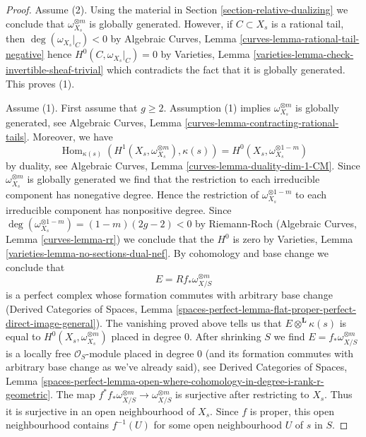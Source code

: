 \documentclass[10pt,a4paper]{amsart}
\theoremstyle{plain}
\theoremstyle{definition}
\theoremstyle{remark}
\numberwithin{equation}{subsection}
\def\Hom{\mathop{\mathrm{Hom}}\nolimits}
\begin{document}
\begin{proof}
Assume (2). Using the material in Section \ref{section-relative-dualizing}
we conclude that $\omega_{X_s}^{\otimes m}$ is
globally generated. However, if $C \subset X_s$
is a rational tail, then $\deg(\omega_{X_s}|_C) < 0$ by
Algebraic Curves, Lemma \ref{curves-lemma-rational-tail-negative}
hence $H^0(C, \omega_{X_s}|_C) = 0$ by
Varieties, Lemma \ref{varieties-lemma-check-invertible-sheaf-trivial}
which contradicts the fact that it is globally generated.
This proves (1).

\medskip\noindent
Assume (1). First assume that $g \geq 2$. Assumption (1) 
implies $\omega_{X_s}^{\otimes m}$ is globally generated,
see Algebraic Curves, Lemma \ref{curves-lemma-contracting-rational-tails}.
Moreover, we have
$$
\Hom_{\kappa(s)}(H^1(X_s, \omega_{X_s}^{\otimes m}), \kappa(s)) =
H^0(X_s, \omega_{X_s}^{\otimes 1 - m})
$$
by duality, see Algebraic Curves, Lemma \ref{curves-lemma-duality-dim-1-CM}.
Since $\omega_{X_s}^{\otimes m}$ is globally generated we find
that the restriction to each irreducible component has nonegative degree.
Hence the restriction of $\omega_{X_s}^{\otimes 1 - m}$ to each
irreducible component has nonpositive degree. Since
$\deg(\omega_{X_s}^{\otimes 1 - m}) = (1 - m)(2g - 2) < 0$ by Riemann-Roch
(Algebraic Curves, Lemma \ref{curves-lemma-rr}) we conclude that the $H^0$
is zero by Varieties, Lemma \ref{varieties-lemma-no-sections-dual-nef}.
By cohomology and base change we conclude that
$$
E = Rf_*\omega_{X/S}^{\otimes m}
$$
is a perfect complex whose formation commutes with arbitrary base change
(Derived Categories of Spaces, Lemma
\ref{spaces-perfect-lemma-flat-proper-perfect-direct-image-general}).
The vanishing proved above tells us that $E \otimes^\mathbf{L} \kappa(s)$
is equal to $H^0(X_s, \omega_{X_s}^{\otimes m})$ placed in degree $0$.
After shrinking $S$ we find $E = f_*\omega_{X/S}^{\otimes m}$
is a locally free $\mathcal{O}_S$-module placed in degree $0$
(and its formation commutes with arbitrary base change as
we've already said), see Derived Categories of Spaces, Lemma
\ref{spaces-perfect-lemma-open-where-cohomology-in-degree-i-rank-r-geometric}.
The map $f^*f_*\omega_{X/S}^{\otimes m} \to \omega_{X/S}^{\otimes m}$
is surjective after restricting to $X_s$. Thus it is surjective in
an open neighbourhood of $X_s$. Since $f$ is proper, this open
neighbourhood contains $f^{-1}(U)$ for some open neighbourhood
$U$ of $s$ in $S$.


\end{proof}
\end{document}
